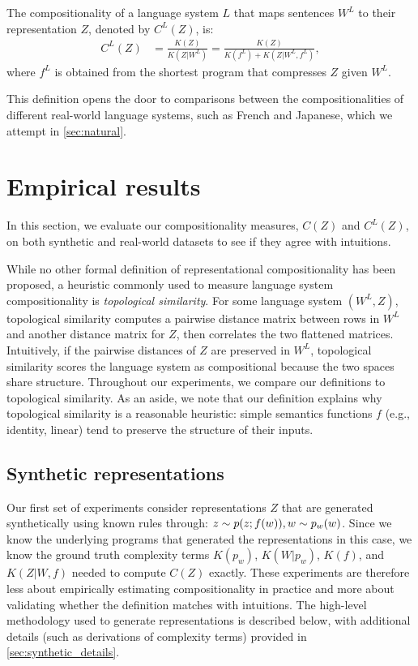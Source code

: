 \documentclass{article}
\begin{document}
\begin{definition}
    \label{def:language_compositionality}
    The compositionality of a language system $L$ that maps sentences $W^L$ to their representation $Z$, denoted by $C^L(Z)$, is:
    \begin{align}
    \label{eq:C^L(Z)}
    C^L(Z) &= \frac{K(Z)}{K(Z|W^L)} = \frac{K(Z)}{K(f^L) + K(Z|W^L,f^L)} ,
    \end{align}
    where $f^L$ is obtained from the shortest program that compresses $Z$ given $W^L$.
\end{definition}

This definition opens the door to comparisons between the compositionalities of different real-world language systems, such as French and Japanese, which we attempt in \cref{sec:natural}.


\section{Empirical results}
\label{sec:experiments}

In this section, we evaluate our compositionality measures, $C(Z)$ and $C^L(Z)$, on both synthetic and real-world datasets to see if they agree with intuitions.

While no other formal definition of representational compositionality has been proposed, a heuristic commonly used to measure language system compositionality is \textit{topological similarity}. For some language system $(W^L, Z)$, topological similarity computes a pairwise distance matrix between rows in $W^L$ and another distance matrix for $Z$, then correlates the two flattened matrices. Intuitively, if the pairwise distances of $Z$ are preserved in $W^L$, topological similarity scores the language system as compositional because the two spaces share structure. Throughout our experiments, we compare our definitions to topological similarity. As an aside, we note that our definition explains why topological similarity is a reasonable heuristic: simple semantics functions $f$ (e.g., identity, linear) tend to preserve the structure of their inputs.

\subsection{Synthetic representations}
\label{sec:synthetic}

Our first set of experiments consider representations $Z$ that are generated synthetically using known rules through: $z \sim p(z ; f(w)),\space w \sim p_w(w)$. Since we know the underlying programs that generated the representations in this case, we know the ground truth complexity terms $K(p_w)$, $K(W | p_w)$, $K(f)$, and $K(Z | W, f)$ needed to compute $C(Z)$ exactly. These experiments are therefore less about empirically estimating compositionality in practice and more about validating whether the definition matches with intuitions. The high-level methodology used to generate representations is described below, with additional details (such as derivations of complexity terms) provided in \cref{sec:synthetic_details}.
\end{document}
